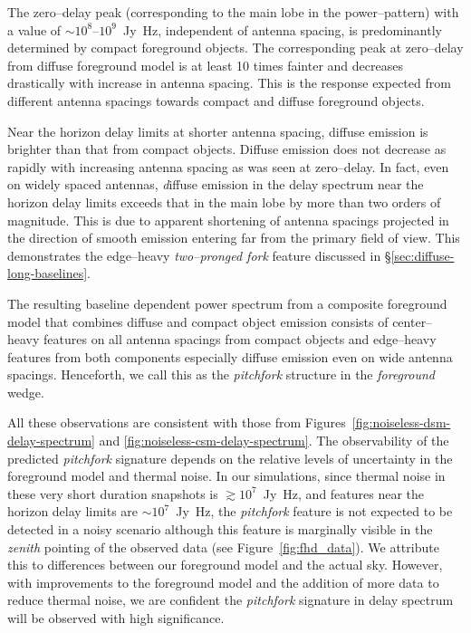 \documentclass[preprint2,iop,numberedappendix]{emulateapj}
\begin{document}
The zero--delay peak (corresponding to the main lobe in the power--pattern) with a value of $\sim 10^8$--$10^9$~Jy~Hz, independent of antenna spacing, is predominantly determined by compact foreground objects. The corresponding peak at zero--delay from diffuse foreground model is at least 10 times fainter and decreases drastically with increase in antenna spacing. This is the response expected from different antenna spacings towards compact and diffuse foreground objects. 

Near the horizon delay limits at shorter antenna spacing, diffuse emission is brighter than that from compact objects. Diffuse emission does not decrease as rapidly with increasing antenna spacing as was seen at zero--delay. In fact, even on widely spaced antennas, {\emph diffuse emission in the delay spectrum near the horizon delay limits exceeds that in the main lobe by more than two orders of magnitude}. This is due to apparent shortening of antenna spacings projected in the direction of smooth emission entering far from the primary field of view. This demonstrates the edge--heavy {\it two--pronged fork} feature discussed in \S\ref{sec:diffuse-long-baselines}.

The resulting baseline dependent power spectrum from a composite foreground model that combines diffuse and compact object emission consists of center--heavy features on all antenna spacings from compact objects and edge--heavy features from both components especially diffuse emission even on wide antenna spacings. Henceforth, we call this as the {\it pitchfork} structure in the {\it foreground} wedge.

All these observations are consistent with those from Figures~\ref{fig:noiseless-dsm-delay-spectrum} and \ref{fig:noiseless-csm-delay-spectrum}. The observability of the predicted {\it pitchfork} signature depends on the relative levels of uncertainty in the foreground model and thermal noise. In our simulations, since thermal noise in these very short duration snapshots is $\gtrsim 10^7$~Jy~Hz, and features near the horizon delay limits are $\sim 10^7$~Jy~Hz, the {\it pitchfork} feature is not expected to be detected in a noisy scenario although this feature is marginally visible in the {\it zenith} pointing of the observed data (see Figure~\ref{fig:fhd_data}). We attribute this to differences between our foreground model and the actual sky. However, with improvements to the foreground model and the addition of more data to reduce thermal noise, we are confident the {\it pitchfork} signature in delay spectrum will be observed with high significance.
\end{document}
